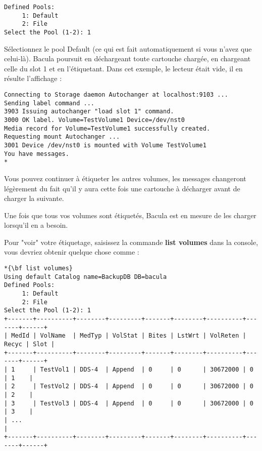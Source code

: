 \footnotesize
\begin{verbatim}
Defined Pools:
     1: Default
     2: File
Select the Pool (1-2): 1
\end{verbatim}
\normalsize

S\'electionnez le pool Default (ce qui est fait automatiquement si vous 
n'avez que celui-l\`a). Bacula poursuit en d\'echargeant toute cartouche 
charg\'ee, en chargeant celle du slot 1 et en l'\'etiquetant. Dans cet exemple, 
le lecteur \'etait vide, il en r\'esulte l'affichage :

\footnotesize
\begin{verbatim}
Connecting to Storage daemon Autochanger at localhost:9103 ...
Sending label command ...
3903 Issuing autochanger "load slot 1" command.
3000 OK label. Volume=TestVolume1 Device=/dev/nst0
Media record for Volume=TestVolume1 successfully created.
Requesting mount Autochanger ...
3001 Device /dev/nst0 is mounted with Volume TestVolume1
You have messages.
*
\end{verbatim}
\normalsize

Vous pouvez continuer \`a \'etiqueter les autres volumes, les messages 
changeront l\'eg\`erement du fait qu'il y aura cette fois une cartouche 
\`a d\'echarger avant de charger la suivante.

Une fois que tous vos volumes sont \'etiquet\'es, Bacula est en mesure de les 
charger lorsqu'il en a besoin. 

Pour "voir" votre \'etiquetage, saisissez la commande {\bf list volumes}  dans 
la console, vous devriez obtenir quelque chose comme :

\footnotesize
\begin{verbatim}
*{\bf list volumes}
Using default Catalog name=BackupDB DB=bacula
Defined Pools:
     1: Default
     2: File
Select the Pool (1-2): 1
+-------+----------+--------+---------+-------+--------+----------+-------+------+
| MedId | VolName  | MedTyp | VolStat | Bites | LstWrt | VolReten | Recyc | Slot |
+-------+----------+--------+---------+-------+--------+----------+-------+------+
| 1     | TestVol1 | DDS-4  | Append  | 0     | 0      | 30672000 | 0     | 1    |
| 2     | TestVol2 | DDS-4  | Append  | 0     | 0      | 30672000 | 0     | 2    |
| 3     | TestVol3 | DDS-4  | Append  | 0     | 0      | 30672000 | 0     | 3    |
| ...                                                                            |
+-------+----------+--------+---------+-------+--------+----------+-------+------+
\end{verbatim}
\normalsize

